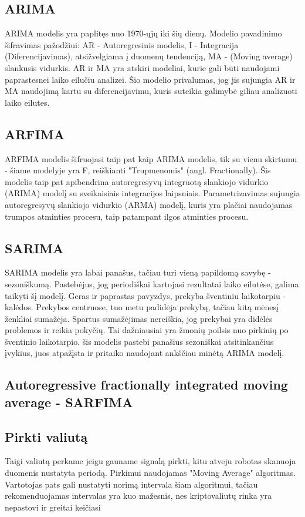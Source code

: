 \documentclass{VUMIFInfKursinis}
\begin{document}
\subsection {ARIMA}
ARIMA modelis yra paplitęs nuo 1970-ųjų iki šių dienų. Modelio pavadinimo šifravimas pažodžiui: AR - Autoregresinis modelis,
I - Integracija (Diferencijavimas), atsižvelgiama į duomenų tendenciją, MA - (Moving average) slankusis vidurkis. AR ir MA yra atskiri
modeliai, kurie gali būti naudojami paprastesnei laiko eilučiu analizei. Šio modelio privalumas, jog jis sujungia AR ir MA naudojimą kartu su
diferencijavimu, kuris suteikia galimybė giliau analizuoti laiko eilutes.

\subsection {ARFIMA}
ARFIMA modelis šifruojasi taip pat kaip ARIMA modelis, tik su vienu skirtumu - šiame modelyje yra F, reiškianti "Trupmenomis" (angl. Fractionally).
Šis modelis taip pat apibendrina autoregresyvų integruotą slankiojo vidurkio (ARIMA) modelį su sveikaisiais integracijos laipsniais.
Parametrizavimas sujungia autoregresyvų slankiojo vidurkio (ARMA) modelį, kuris yra plačiai naudojamas trumpos atminties procesu, taip 
patampant ilgos atminties procesu.

\subsection {SARIMA}
SARIMA modelis yra labai panašus, tačiau turi vieną papildomą savybę - sezoniškumą. Pastebėjus, jog periodiškai kartojasi rezultatai laiko eilutėse, 
galima taikyti šį modelį. Geras ir paprastas pavyzdys, prekyba šventiniu laikotarpiu - kalėdos. Prekybos centruose, tuo metu padidėja prekybą, tačiau 
kitą mėnesį ženkliai sumažėja. Spartus sumažėjimas nereiškia, jog prekybai yra didėlės problemos ir reikia pokyčių. Tai dažniausiai yra žmonių 
poilsis nuo pirkinių po šventinio laikotarpio. šis modelis pastebi panašius sezoniškai atsitinkančius įvykius, juos atpažįsta ir pritaiko naudojant
ankščiau minėtą ARIMA modelį. 

\subsection {Autoregressive fractionally integrated moving average - SARFIMA}

\subsection{Pirkti valiutą}
Taigi valiutą perkame jeigu gauname signalą pirkti, kitu atveju robotas skanuoja duomenis nustatyta periodą. Pirkimui naudojamas "Moving Average" algoritmas. 
Vartotojas pats gali nustatyti norimą intervala šiam algoritmui, tačiau rekomenduojamas intervalas yra kuo mažesnis, nes kriptovaliutų rinka 
yra nepastovi ir greitai keičiasi 
\end{document}
